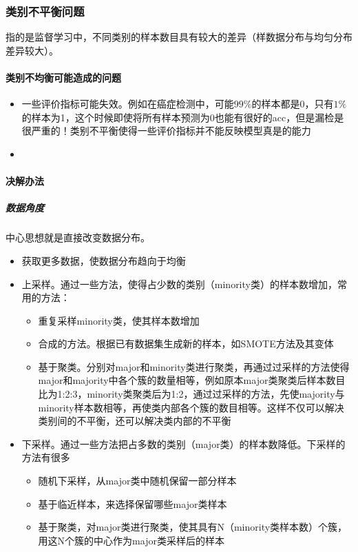 \subsubsection{类别不平衡问题}
指的是监督学习中，不同类别的样本数目具有较大的差异（样数据分布与均匀分布差异较大）。
\paragraph{类别不均衡可能造成的问题}
\begin{itemize}
	\item 一些评价指标可能失效。例如在癌症检测中，可能$99\%$的样本都是0，只有$1\%$的样本为1，这个时候即使将所有样本预测为0也能有很好的acc，但是漏检是很严重的！类别不平衡使得一些评价指标并不能反映模型真是的能力
	\item 
\end{itemize}

\paragraph{决解办法}
\subparagraph{数据角度}
中心思想就是直接改变数据分布。
\begin{itemize}
	\item 获取更多数据，使数据分布趋向于均衡
	\item 上采样。通过一些方法，使得占少数的类别（minority类）的样本数增加，常用的方法：
	\begin{itemize}
		\item 重复采样minority类，使其样本数增加
		\item 合成的方法。根据已有数据集生成新的样本，如SMOTE方法及其变体
		\item 基于聚类。分别对major和minority类进行聚类，再通过过采样的方法使得major和majority中各个簇的数量相等，例如原本major类聚类后样本数目比为1:2:3，minority类聚类后为1:2，通过过采样的方法，先使majority与minority样本数相等，再使类内部各个簇的数目相等。这样不仅可以解决类别间的不平衡，还可以解决类内部的不平衡
	\end{itemize}
	\item 下采样。通过一些方法把占多数的类别（major类）的样本数降低。下采样的方法有很多
	\begin{itemize}
		\item 随机下采样，从major类中随机保留一部分样本
		\item 基于临近样本，来选择保留哪些major类样本
		\item 基于聚类，对major类进行聚类，使其具有N（minority类样本数）个簇，用这N个簇的中心作为major类采样后的样本
	\end{itemize}
\end{itemize}

